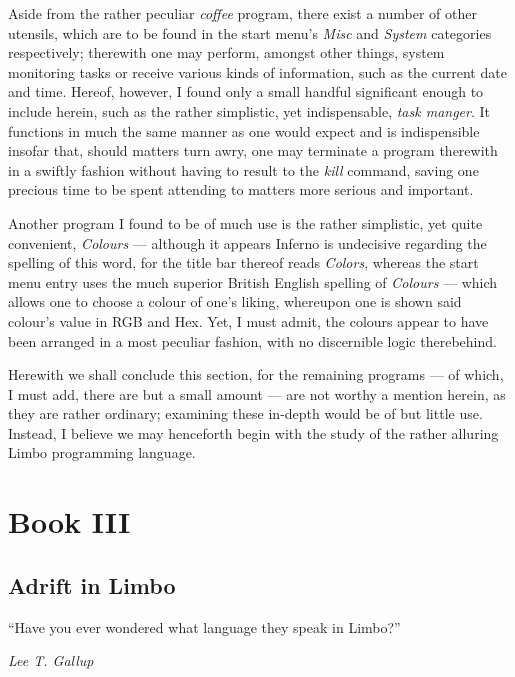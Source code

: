 \documentclass[a5paper,twoside,12pt]{report}
\begin{document}
  Aside from the rather peculiar \textit{coffee} program, there exist a number of other utensils, which are to be found in the start menu's \textit{Misc} and \textit{System} categories respectively; therewith one may perform, amongst other things, system monitoring tasks or receive various kinds of information, such as the current date and time. Hereof, however, I found only a small handful significant enough to include herein, such as the rather simplistic, yet indispensable, \textit{task manger}. It functions in much the same manner as one would expect and is indispensible insofar that, should matters turn awry, one may terminate a program therewith in a swiftly fashion without having to result to the \textit{kill} command, saving one precious time to be spent attending to matters more serious and important.
  
  Another program I found to be of much use is the rather simplistic, yet quite convenient, \textit{Colours} — although it appears Inferno is undecisive regarding the spelling of this word, for the title bar thereof reads \textit{Colors}, whereas the start menu entry uses the much superior British English spelling of \textit{Colours} — which allows one to choose a colour of one's liking, whereupon one is shown said colour's value in RGB and Hex. Yet, I must admit, the colours appear to have been arranged in a most peculiar fashion, with no discernible logic therebehind.

  Herewith we shall conclude this section, for the remaining programs — of which, I must add, there are but a small amount — are not worthy a mention herein, as they are rather ordinary; examining these in-depth would be of but little use. Instead, I believe we may henceforth begin with the study  of the rather alluring Limbo programming language.  \newpage

\part*{Book III}
  \newpage

\thispagestyle{empty}
  \mbox{}
  \newpage

\chapter*{Adrift in Limbo}

\epigraph{``Have you ever wondered what language they speak in Limbo?''}{\textit{Lee T. Gallup}}
\end{document}
